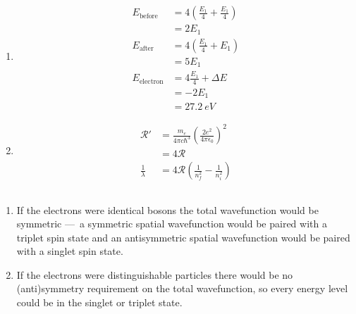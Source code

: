 \documentclass{article}
\begin{document}
\setcounter{subsection}{12}
\subsection{}

\begin{enumerate}
  \item

        \begin{align*}
          E_\text{before}   & = 4 \left( \frac{E_1}{4} + \frac{E_1}{4} \right) \\
                            & = 2 E_1                                          \\
          E_\text{after}    & = 4 \left( \frac{E_1}{4} + E_1 \right)           \\
                            & = 5 E_1                                          \\
          E_\text{electron} & = 4 \frac{E_1}{4} + \Delta E                     \\
                            & = -2 E_1                                         \\
                            & = \qty{27.2}{eV}
        \end{align*}

  \item

        \begin{align*}
          \mathcal{R}'      & = \frac{m_e}{4 \pi c \hbar^3} \left( \frac{2 e^2}{4 \pi \epsilon_0} \right)^2 \\
                            & = 4 \mathcal{R}                                                               \\
          \frac{1}{\lambda} & = 4 \mathcal{R} \left( \frac{1}{n_f^2} - \frac{1}{n_i^2} \right)
        \end{align*}
\end{enumerate}

\subsection{}

\begin{enumerate}
  \item If the electrons were identical bosons the total wavefunction would be symmetric — a symmetric spatial wavefunction would be paired with a triplet spin state and an antisymmetric spatial wavefunction would be paired with a singlet spin state.

  \item If the electrons were distinguishable particles there would be no \\ (anti)symmetry requirement on the total wavefunction, so every energy level could be in the singlet or triplet state.
\end{enumerate}
\end{document}
